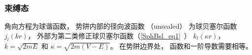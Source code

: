 
\begin{issues}
\issueDraft
\end{issues}


\subsubsection{束缚态}

角向方程为球谐函数， 势阱内部的径向波函数 （unscaled） 为球贝塞尔函数 $j_l(kr)$，  外部为第二类修正球贝塞尔函数（\autoref{SphBsl_eq1}~） $k_l(\kappa r)$，   $k = \sqrt{2mE}$ 和 $\kappa = \sqrt{2m(V - E)}$。 在势阱边界处， 函数和一阶导数需要相等。 
